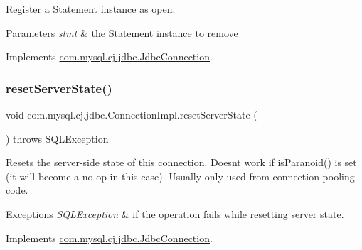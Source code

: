 Register a Statement instance as open.


\begin{DoxyParams}{Parameters}
{\em stmt} & the Statement instance to remove \\
\hline
\end{DoxyParams}


Implements \mbox{\hyperlink{interfacecom_1_1mysql_1_1cj_1_1jdbc_1_1_jdbc_connection}{com.\+mysql.\+cj.\+jdbc.\+Jdbc\+Connection}}.

\mbox{\label{classcom_1_1mysql_1_1cj_1_1jdbc_1_1_connection_impl_adccdf6ec2e52545cff1a649ccecbdd62}} 
\subsubsection{\texorpdfstring{reset\+Server\+State()}{resetServerState()}}
{\footnotesize\ttfamily void com.\+mysql.\+cj.\+jdbc.\+Connection\+Impl.\+reset\+Server\+State (\begin{DoxyParamCaption}{ }\end{DoxyParamCaption}) throws S\+Q\+L\+Exception}

Resets the server-\/side state of this connection. Doesn\textquotesingle{}t work if is\+Paranoid() is set (it will become a no-\/op in this case). Usually only used from connection pooling code.


\begin{DoxyExceptions}{Exceptions}
{\em S\+Q\+L\+Exception} & if the operation fails while resetting server state. \\
\hline
\end{DoxyExceptions}


Implements \mbox{\hyperlink{interfacecom_1_1mysql_1_1cj_1_1jdbc_1_1_jdbc_connection_a44456aec7737354a14eff20638c047fa}{com.\+mysql.\+cj.\+jdbc.\+Jdbc\+Connection}}.

\mbox{\label{classcom_1_1mysql_1_1cj_1_1jdbc_1_1_connection_impl_adb29692483164e8c98dbeb9c6eb5a972}} 
